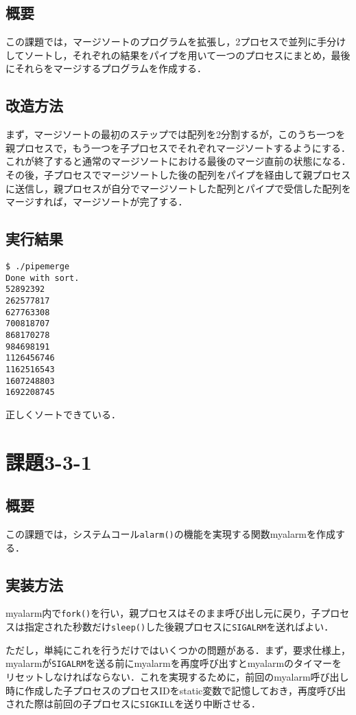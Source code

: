 \documentclass[a4j,10pt,titlepage]{jsarticle}
\begin{document}
\subsection{概要}
この課題では，マージソートのプログラムを拡張し，2プロセスで並列に手分けしてソートし，それぞれの結果をパイプを用いて一つのプロセスにまとめ，最後にそれらをマージするプログラムを作成する．

\subsection{改造方法}
まず，マージソートの最初のステップでは配列を2分割するが，このうち一つを親プロセスで，もう一つを子プロセスでそれぞれマージソートするようにする．これが終了すると通常のマージソートにおける最後のマージ直前の状態になる．その後，子プロセスでマージソートした後の配列をパイプを経由して親プロセスに送信し，親プロセスが自分でマージソートした配列とパイプで受信した配列をマージすれば，マージソートが完了する．

\subsection{実行結果}
\begin{verbatim}
$ ./pipemerge 
Done with sort.
52892392
262577817
627763308
700818707
868170278
984698191
1126456746
1162516543
1607248803
1692208745
\end{verbatim}
正しくソートできている．

\section{課題3-3-1}
\subsection{概要}
この課題では，システムコール\verb|alarm()|の機能を実現する関数myalarmを作成する．

\subsection{実装方法}
myalarm内で\verb|fork()|を行い，親プロセスはそのまま呼び出し元に戻り，子プロセスは指定された秒数だけ\verb|sleep()|した後親プロセスに\verb|SIGALRM|を送ればよい．

ただし，単純にこれを行うだけではいくつかの問題がある．まず，要求仕様上，myalarmが\verb|SIGALRM|を送る前にmyalarmを再度呼び出すとmyalarmのタイマーをリセットしなければならない．これを実現するために，前回のmyalarm呼び出し時に作成した子プロセスのプロセスIDをstatic変数で記憶しておき，再度呼び出された際は前回の子プロセスに\verb|SIGKILL|を送り中断させる．
\end{document}
